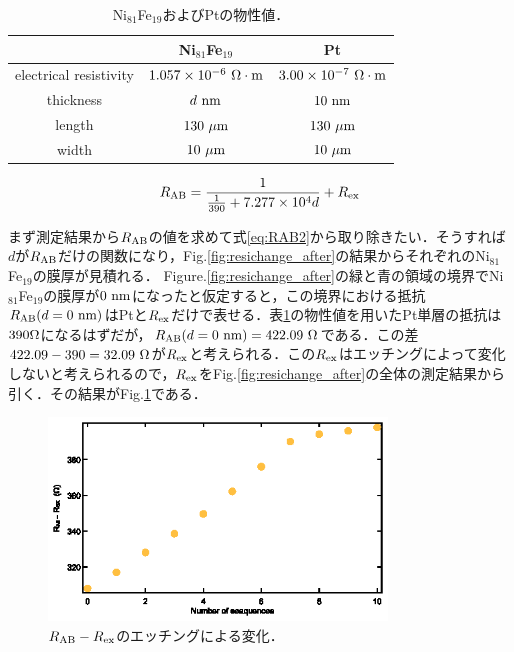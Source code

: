 \begin{table}[hbtp]
  \caption{Ni$_{81}$Fe$_{19}$およびPtの物性値．}
  \label{table:resi}
  \centering
  \begin{tabular}{ccc}%
    \hline
           &   Ni$_{81}$Fe$_{19}$   & Pt  \\
    \hline \hline
   electrical resistivity  & $1.057\times10^{-6}\rm\ \Omega\cdot m$  & $3.00\times10^{-7}\rm\ \Omega\cdot m$\\
   thickness  &  $d\rm\ nm$  &  $10\rm\ nm$\\
   length  &  $130\rm\ \mu m$  &  $130\rm\ \mu m$\\
   width  &  $10\rm\ \mu m$   &  $10\rm\ \mu m$\\
    \hline
  \end{tabular}
\end{table}


\begin{eqnarray}
R_{\rm AB} = \frac{1}{\frac{1}{390}+7.277\times10^{4}d} + R_{\rm ex}
\label{eq:RAB2}
\end{eqnarray}

まず測定結果から$R_{\rm AB}$の値を求めて式\ref{eq:RAB2}から取り除きたい．そうすれば$d$が$R_{\rm AB}$だけの関数になり，Fig.\ref{fig:resichange_after}の結果からそれぞれのNi$_{81}$Fe$_{19}$の膜厚が見積れる．
Figure.\ref{fig:resichange_after}の緑と青の領域の境界でNi$_{81}$Fe$_{19}$の膜厚が$0\rm\ nm$になったと仮定すると，この境界における抵抗$R_{\rm AB}(d=0\rm\ nm)$はPtと$R_{\rm ex}$だけで表せる．表\ref{table:resi}の物性値を用いたPt単層の抵抗は$390\rm \Omega$になるはずだが，$R_{\rm AB}(d=0\rm\ nm) = 422.09\rm\ \Omega$である．この差$422.09-390 = 32.09\rm\ \Omega$が$R_{\rm ex}$と考えられる．この$R_{\rm ex}$はエッチングによって変化しないと考えられるので，$R_{\rm ex}$をFig.\ref{fig:resichange_after}の全体の測定結果から引く．その結果がFig.\ref{fig:RAB-Rex}である．


\begin{figure}[htbp]
\centerline{
\includegraphics[width=9cm]{images/RAB-Rex.eps}
}
\caption{$R_{\rm AB}-R_{\rm ex}$のエッチングによる変化．
}
\label{fig:RAB-Rex}
\end{figure}

